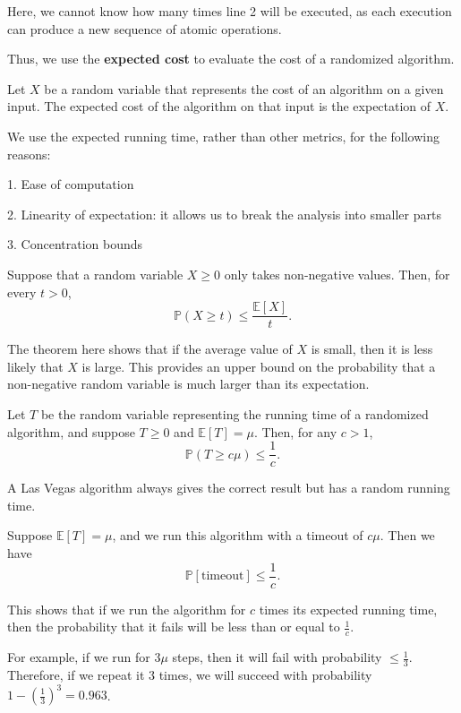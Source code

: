Here, we cannot know how many times line 2 will be executed, as each execution can produce a new sequence of atomic operations.

Thus, we use the \textbf{expected cost} to evaluate the cost of a randomized algorithm. 

\begin{definition}
  Let \(X\) be a random variable that represents the cost of an algorithm on a given input. The expected cost of the algorithm on that input is the expectation of \(X\). 
\end{definition}

We use the expected running time, rather than other metrics, for the following reasons: 

1. Ease of computation

2. Linearity of expectation: it allows us to break the analysis into smaller parts

3. Concentration bounds

\begin{theorem}
  Suppose that a random variable \(X \geq 0\) only takes non-negative values. Then, for every \(t > 0\),
  \[
      \mathbb{P}(X \geq t) \leq \dfrac{\mathbb{E}[X]}{t}.
  \]
\end{theorem}

The theorem here shows that if the average value of \(X\) is small, then it is less likely that \(X\) is large. This provides an upper bound on the probability that a non-negative random variable is much larger than its expectation. 

Let \(T\) be the random variable representing the running time of a randomized algorithm, and suppose \(T \geq 0\) and \(\mathbb{E}[T] = \mu\). Then, for any \(c > 1\),
\[
    \mathbb{P}(T \geq c \mu) \leq \dfrac{1}{c}.
\]

\begin{eg}
  A Las Vegas algorithm always gives the correct result but has a random running time.

  Suppose \(\mathbb{E}[T] = \mu\), and we run this algorithm with a timeout of \(c \mu\). Then we have 
  \[
    \mathbb{P}[\text{timeout}] \leq \dfrac{1}{c}.
  \]

  This shows that if we run the algorithm for \(c\) times its expected running time, then the probability that it fails will be less than or equal to \(\frac{1}{c}\). 

  For example, if we run for \(3\mu\) steps, then it will fail with probability \(\leq \frac{1}{3}\). Therefore, if we repeat it 3 times, we will succeed with probability \(1 - \left(\frac{1}{3}\right)^3 = 0.963\).
\end{eg}
